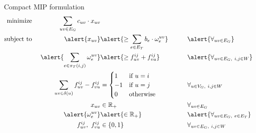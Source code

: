 \documentclass[aspectratio=149]{beamer}
\begin{document}
    \begin{frame}{Compact MIP formulation}
        \vspace*{-1em}
        \begin{alignat*}{5}
            \text{minimize}\ && \sum_{uv \in E_G} c_{uv} \cdot x_{uv} &&& \\
            \text{subject to}\ && \alert{x_{uv}} &\alert{\ge \sum_{e \in E_T} b_e \cdot \omega_e^{uv}} &&\qquad \alert{\forall_{uv \in E_G}} \\
            && \alert{\sum_{e \in \pi_T(i,j)} \omega_e^{uv}} &\alert{\ge f_{uv}^{ij} + f_{vu}^{ij}} &&\qquad \alert{\forall_{uv \in E_G,\ i,j \in W}} \\
            && \sum_{uv \in \delta(u)} f_{uv}^{ij} - f_{vu}^{ij} &= \begin{cases}
                                         1 & \text{if $u = i$} \\
                                         -1 & \text{if $u = j$} \\
                                         0 & \text{otherwise}
            \end{cases} &&\qquad \forall_{u \in V_G,\ i,j \in W} \\
            && x_{uv} &\in \mathbb{R}_+ &&\qquad \forall_{uv \in E_G} \\
            && \alert{\omega_e^{uv}} &\alert{\in \mathbb{R}_+} &&\qquad \alert{\forall_{uv \in E_G,\ e \in E_T}} \\
            && f_{uv}^{ij},\ f_{vu}^{ij} &\in \{ 0, 1 \} &&\qquad \forall_{uv \in E_G,\ i,j \in W}
        \end{alignat*}%
    \end{frame}
\end{document}

